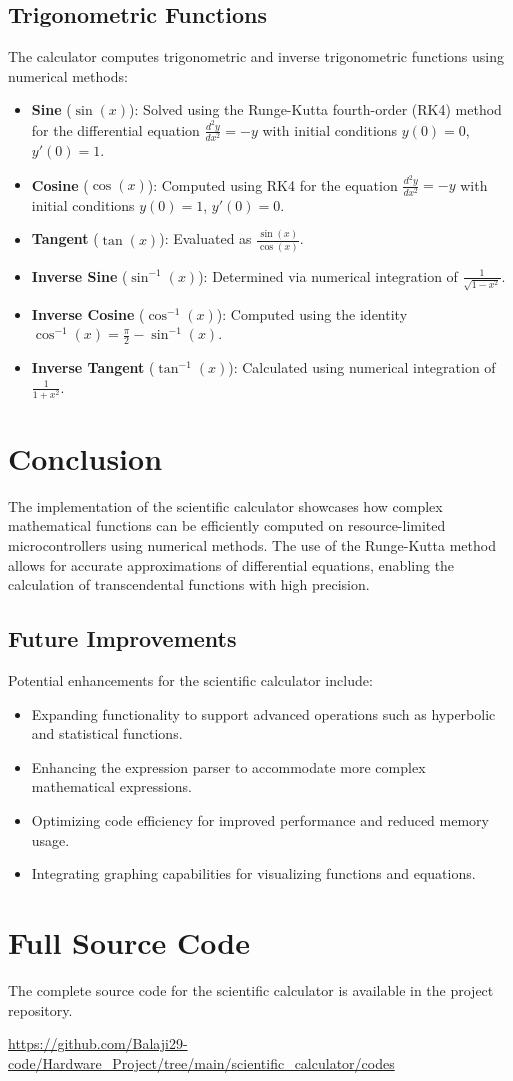 \documentclass[12pt,a4paper]{article}
\begin{document}
\subsection{Trigonometric Functions}  
The calculator computes trigonometric and inverse trigonometric functions using numerical methods:  

\begin{itemize}  
    \item \textbf{Sine} ($\sin(x)$): Solved using the Runge-Kutta fourth-order (RK4) method for the differential equation $\frac{d^2y}{dx^2} = -y$ with initial conditions $y(0) = 0$, $y'(0) = 1$.  
    \item \textbf{Cosine} ($\cos(x)$): Computed using RK4 for the equation $\frac{d^2y}{dx^2} = -y$ with initial conditions $y(0) = 1$, $y'(0) = 0$.  
    \item \textbf{Tangent} ($\tan(x)$): Evaluated as $\frac{\sin(x)}{\cos(x)}$.  
    \item \textbf{Inverse Sine} ($\sin^{-1}(x)$): Determined via numerical integration of $\frac{1}{\sqrt{1-x^2}}$.  
    \item \textbf{Inverse Cosine} ($\cos^{-1}(x)$): Computed using the identity $\cos^{-1}(x) = \frac{\pi}{2} - \sin^{-1}(x)$.  
    \item \textbf{Inverse Tangent} ($\tan^{-1}(x)$): Calculated using numerical integration of $\frac{1}{1+x^2}$.  
\end{itemize}  

\section{Conclusion}  
The implementation of the scientific calculator showcases how complex mathematical functions can be efficiently computed on resource-limited microcontrollers using numerical methods. The use of the Runge-Kutta method allows for accurate approximations of differential equations, enabling the calculation of transcendental functions with high precision.  

\subsection{Future Improvements}  
Potential enhancements for the scientific calculator include:  

\begin{itemize}  
    \item Expanding functionality to support advanced operations such as hyperbolic and statistical functions.  
    \item Enhancing the expression parser to accommodate more complex mathematical expressions.  
    \item Optimizing code efficiency for improved performance and reduced memory usage.  
    \item Integrating graphing capabilities for visualizing functions and equations.  
\end{itemize}  

\section{Full Source Code}
The complete source code for the scientific calculator is available in the project repository.

\url{https://github.com/Balaji29-code/Hardware_Project/tree/main/scientific_calculator/codes}
\end{document}
